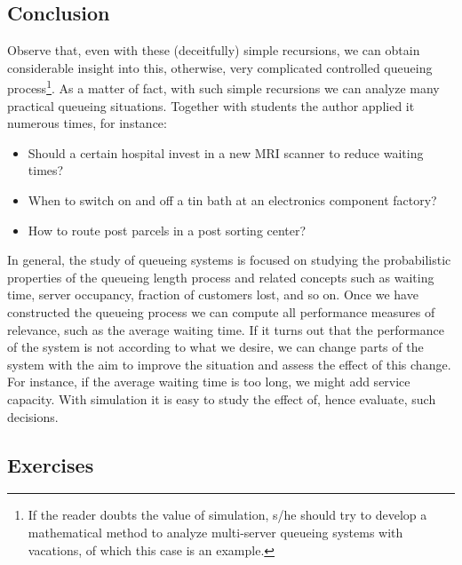 \subsection*{Conclusion}
\label{sec:conclusion}

Observe that, even with these (deceitfully) simple recursions, we can obtain considerable insight into this, otherwise, very complicated controlled queueing process\footnote{If the reader doubts the value of simulation, s/he should try to develop a mathematical method to analyze multi-server queueing systems with vacations, of which this case is an example.}.
As a matter of fact, with such simple recursions we can analyze many practical queueing situations.
Together with students the author applied it numerous times, for instance:
\begin{itemize}
\item Should a certain hospital invest in a new MRI scanner to reduce
  waiting times?
\item When to switch on and off a tin bath at an electronics component factory?
\item How to route post parcels in a post sorting center?
\end{itemize}

In general, the study of queueing systems is focused on studying the probabilistic properties of the queueing length process and related concepts such as waiting time, server occupancy, fraction of customers lost, and so on.
Once we have constructed the queueing process we can compute all performance measures of relevance, such as the average waiting time.
If it turns out that the performance of the system is not according to what we desire, we can change parts of the system with the aim to improve the situation and assess the effect of this change.
For instance, if the average waiting time is too long, we might add service capacity.
With simulation it is easy to study the effect of, hence evaluate, such decisions.

\subsection*{Exercises}
\label{sec:exercises-1}


